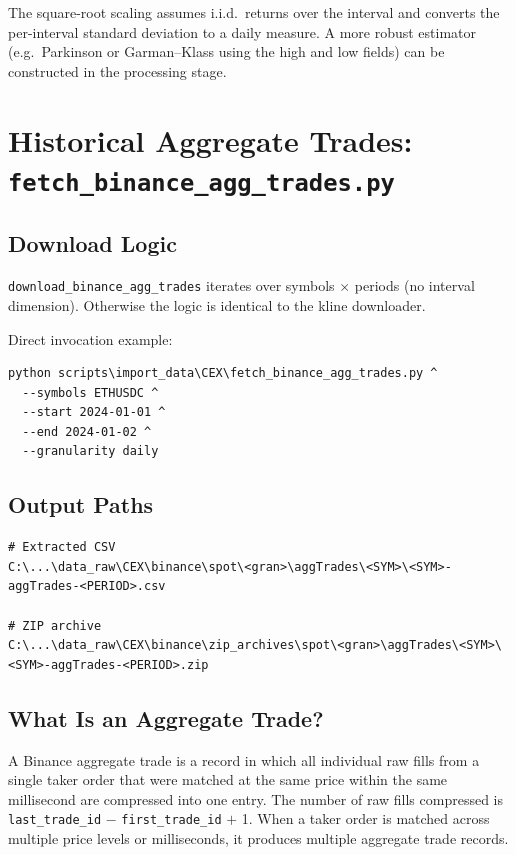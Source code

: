 \documentclass[11pt,a4paper]{article}
\begin{document}
The square-root scaling assumes i.i.d.\ returns over the interval
and converts the per-interval standard deviation to a daily measure.
A more robust estimator (e.g.\ Parkinson or Garman--Klass using the
high and low fields) can be constructed in the processing stage.

\section{Historical Aggregate Trades: \texttt{fetch\_binance\_agg\_trades.py}}
\label{sec:aggtrades}

\subsection{Download Logic}

\texttt{download\_binance\_agg\_trades} iterates over symbols
$\times$ periods (no interval dimension). Otherwise the logic is
identical to the kline downloader.

Direct invocation example:
\begin{lstlisting}
python scripts\import_data\CEX\fetch_binance_agg_trades.py ^
  --symbols ETHUSDC ^
  --start 2024-01-01 ^
  --end 2024-01-02 ^
  --granularity daily
\end{lstlisting}

\subsection{Output Paths}

\begin{lstlisting}
# Extracted CSV
C:\...\data_raw\CEX\binance\spot\<gran>\aggTrades\<SYM>\<SYM>-aggTrades-<PERIOD>.csv

# ZIP archive
C:\...\data_raw\CEX\binance\zip_archives\spot\<gran>\aggTrades\<SYM>\<SYM>-aggTrades-<PERIOD>.zip
\end{lstlisting}

\subsection{What Is an Aggregate Trade?}

A Binance aggregate trade is a record in which all individual raw
fills from a single taker order that were matched at the same price
within the same millisecond are compressed into one entry. The number
of raw fills compressed is \texttt{last\_trade\_id} $-$
\texttt{first\_trade\_id} $+$ 1. When a taker order is matched across
multiple price levels or milliseconds, it produces multiple aggregate
trade records.
\end{document}
